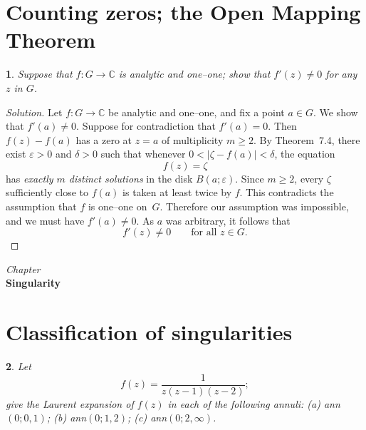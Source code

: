 \documentclass[12pt, a4paper]{report}
\newcommand{\chapter}[1]{%
  \par\vspace{2em}%
  \refstepcounter{section}%
  \begin{center}
    \textit{Chapter \thesection} \\[1.5ex]
    \textbf{#1}
  \end{center}
  \vspace{1em}%
}
\theoremstyle{spaced}
\newtheorem{exercise}{}
\newcommand{\setexercise}[1]{\setcounter{exercise}{#1-1}}
\begin{document}
\section{Counting zeros; the Open Mapping Theorem}
\setexercise{4}
\begin{exercise}
	Suppose that $f : G \to \mathbb{C}$ is analytic and one--one; show that $f'(z) \neq 0$ for any $z$ in $G$.
\end{exercise}

\begin{proof}[Solution]
	Let $f : G \to \mathbb{C}$ be analytic and one--one, and fix a point
	$a \in G$.  We show that $f'(a) \neq 0$.
	Suppose for contradiction that $f'(a)=0$.
	Then $f(z)-f(a)$ has a zero at $z=a$ of multiplicity $m \ge 2$.
	By Theorem~7.4, there exist $\varepsilon>0$ and $\delta>0$ such that
	whenever $0<|\zeta - f(a)| < \delta$, the equation
	\[
		f(z)=\zeta
	\]
	has \emph{exactly $m$ distinct solutions} in the disk $B(a;\varepsilon)$.
	Since $m\ge 2$, every $\zeta$ sufficiently close to $f(a)$ is taken at
	least twice by $f$.
	This contradicts the assumption that $f$ is one--one on~$G$.
	Therefore our assumption was impossible, and we must have $f'(a) \neq 0$.
	As $a$ was arbitrary, it follows that
	\[
		f'(z) \neq 0 \qquad \text{for all } z \in G.
	\]
\end{proof}

\chapter{Singularity}
\section{Classification of singularities}
\setexercise{4}
\begin{exercise}
	Let
	\[
		f(z)=\frac{1}{z(z-1)(z-2)};
	\]
	give the Laurent expansion of \(f(z)\) in each of the following annuli:
	(a) ann\((0;0,1)\);
	(b) ann\((0;1,2)\);
	(c) ann\((0;2,\infty)\).
\end{exercise}
\end{document}
